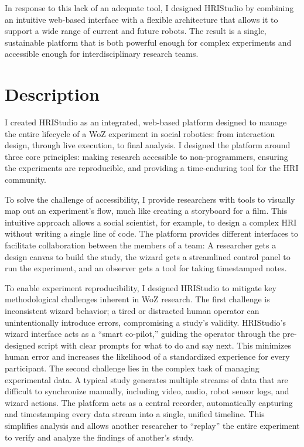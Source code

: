 \documentclass[numbib]{buthesis_p}  %
\begin{document}
In response to this lack of an adequate tool, I designed HRIStudio by combining an intuitive web-based interface with a flexible architecture that allows it to support a wide range of current and future robots. The result is a single, sustainable platform that is both powerful enough for complex experiments and accessible enough for interdisciplinary research teams.

\section{Description}

I created HRIStudio as an integrated, web-based platform designed to manage the entire lifecycle of a WoZ experiment in social robotics: from interaction design, through live execution, to final analysis. I designed the platform around three core principles: making research accessible to non-programmers, ensuring the experiments are reproducible, and providing a time-enduring tool for the HRI community.

To solve the challenge of accessibility, I provide researchers with tools to visually map out an experiment's flow, much like creating a storyboard for a film. This intuitive approach allows a social scientist, for example, to design a complex HRI without writing a single line of code. The platform provides different interfaces to facilitate collaboration between the members of a team: A researcher gets a design canvas to build the study, the wizard gets a streamlined control panel to run the experiment, and an observer gets a tool for taking timestamped notes.

To enable experiment reproducibility, I designed HRIStudio to mitigate key methodological challenges inherent in WoZ research. The first challenge is inconsistent wizard behavior; a tired or distracted human operator can unintentionally introduce errors, compromising a study's validity. HRIStudio's wizard interface acts as a ``smart co-pilot,'' guiding the operator through the pre-designed script with clear prompts for what to do and say next. This minimizes human error and increases the likelihood of a standardized experience for every participant. The second challenge lies in the complex task of managing experimental data. A typical study generates multiple streams of data that are difficult to synchronize manually, including video, audio, robot sensor logs, and wizard actions. The platform acts as a central recorder, automatically capturing and timestamping every data stream into a single, unified timeline. This simplifies analysis and allows another researcher to ``replay'' the entire experiment to verify and analyze the findings of another's study.
\end{document}
